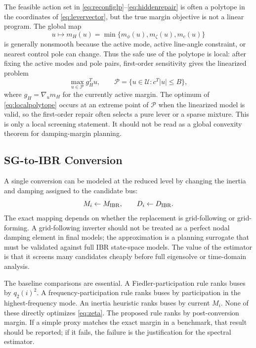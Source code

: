\documentclass[journal]{IEEEtran}
\begin{document}
The feasible action set in \eqref{eq:reconfiglp}--\eqref{eq:hiddenrepair} is often a polytope in the coordinates of \eqref{eq:levervector}, but the true margin objective is not a linear program. The global map
\begin{equation}
u\mapsto m_H(u)
=\min\{m_\phi(u),m_\zeta(u),m_c(u)\}
\label{eq:nonconvexmarginmap}
\end{equation}
is generally nonsmooth because the active mode, active line-angle constraint, or nearest control pole can change. Thus the safe use of the polytope is local: after fixing the active modes and pole pairs, first-order sensitivity gives the linearized problem
\begin{equation}
\max_{u\in\mathcal{P}} g_H^Tu,
\qquad
\mathcal{P}=\{u\in\mathcal{U}:c^T|u|\le B\},
\label{eq:localpolytope}
\end{equation}
where $g_H=\nabla_u m_H$ for the currently active margin. The optimum of \eqref{eq:localpolytope} occurs at an extreme point of $\mathcal{P}$ when the linearized model is valid, so the first-order repair often selects a pure lever or a sparse mixture. This is only a local screening statement. It should not be read as a global convexity theorem for damping-margin planning.

\subsection{SG-to-IBR Conversion}

A single conversion can be modeled at the reduced level by changing the inertia and damping assigned to the candidate bus:
\begin{equation}
M_i\leftarrow M_{\rm IBR},\qquad D_i\leftarrow D_{\rm IBR}.
\end{equation}
The exact mapping depends on whether the replacement is grid-following or grid-forming. A grid-following inverter should not be treated as a perfect nodal damping element in final models; the approximation is a planning surrogate that must be validated against full IBR state-space models. The value of the estimator is that it screens many candidates cheaply before full eigensolve or time-domain analysis.

The baseline comparisons are essential. A Fiedler-participation rule ranks buses by $q_2(i)^2$. A frequency-participation rule ranks buses by participation in the highest-frequency mode. An inertia heuristic ranks buses by current $M_i$. None of these directly optimizes \eqref{eq:zeta}. The proposed rule ranks by post-conversion margin. If a simple proxy matches the exact margin in a benchmark, that result should be reported; if it fails, the failure is the justification for the spectral estimator.
\end{document}
